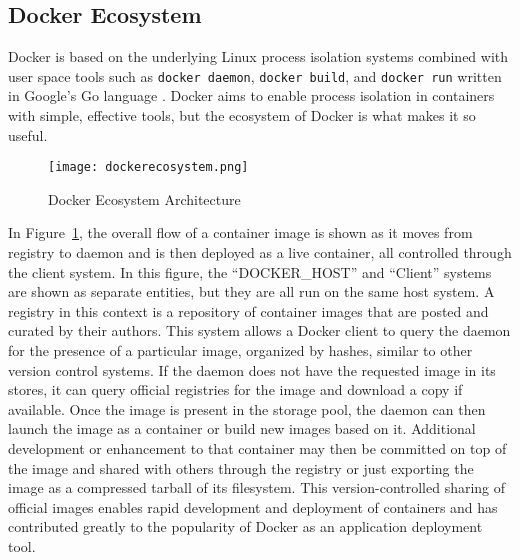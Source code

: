 \subsection{Docker Ecosystem} %
\label{sec:dockerecosystem}
Docker is based on the underlying Linux process isolation systems combined with user space tools such as \texttt{docker daemon}, \texttt{docker build}, and \texttt{docker run} written in Google's Go language \autocite{dockerarch1}. 
Docker aims to enable process isolation in containers with simple, effective tools, but the ecosystem of Docker is what makes it so useful.  
\begin{figure}
    \centering
    \texttt{[image: dockerecosystem.png]}
    \caption{Docker Ecosystem Architecture \autocite{dockerarch1}}
    \label{fig:dockerecosystem}
\end{figure}
In Figure~\ref{fig:dockerecosystem}, the overall flow of a container image is shown as it moves from registry to daemon and is then deployed as a live container, all controlled through the client system.  
In this figure, the ``DOCKER\_HOST'' and ``Client'' systems are shown as separate entities, but they are all run on the same host system.
A registry in this context is a repository of container images that are posted and curated by their authors.
This system allows a Docker client to query the daemon for the presence of a particular image, organized by hashes, similar to other version control systems.  
If the daemon does not have the requested image in its stores, it can query official registries for the image and download a copy if available.  
Once the image is present in the storage pool, the daemon can then launch the image as a container or build new images based on it.  
Additional development or enhancement to that container may then be committed on top of the image and shared with others through the registry or just exporting the image as a compressed tarball of its filesystem.  
This version-controlled sharing of official images enables rapid development and deployment of containers and has contributed greatly to the popularity of Docker as an application deployment tool.

